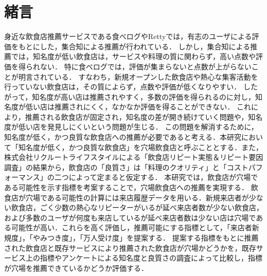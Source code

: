 \chapter{緒言}
\label{chap:intro}
身近な飲食店推薦サービスである食べログ\footnotemark{}やRetty\footnotemark{}では，有志のユーザによる評価をもとにした，集合知による推薦が行われている．
しかし，集合知による推薦では，知名度が低い飲食店は，サービスや料理の質に関わらず，高い点数や評価を得られない．
特に食べログでは，評価が集まらないと点数が上がらないことが明言されている\cite{score}．
すなわち，新規オープンした飲食店や熱心な集客活動を行っていない飲食店は，その質によらず，点数や評価が低くなりやすい．
したがって，知名度が高い店は推薦されやすく，多数の評価を得られるのに対し，知名度が低い店は推薦されにくく，なかなか評価を得ることができない．
これにより，推薦される飲食店が固定され，知名度の差が開き続けていく問題や，知名度が低い店を発見しにくいという問題が生じる．
この問題を解消するために，知名度が低く，かつ良質な飲食店への推薦が必要であると考える．本研究において「知名度が低く，かつ良質な飲食店」を穴場飲食店と呼ぶこととする．また，株式会社リクルートライフスタイルによる「飲食店リピート実態＆リピート要因調査」\cite{repeat}の結果から，飲食店の「良質さ」は「料理のクオリティ」と「コストパフォーマンス」の二つによって定まると仮定する．
本研究では，飲食店が穴場である可能性を示す指標を考案することで，穴場飲食店への推薦を実現する．
飲食店が穴場である可能性の計算には来店履歴データを用いる．新規来店者が少ない飲食店，ごく少数の熱心なリピーターがいるが延べ来店者数が少ない飲食店，および多数のユーザが何度も来店しているが延べ来店者数は少ない店は穴場である可能性が高い．これらを高く評価し，推薦可能にする指標として，「来店者新規度」，「やみつき度」，「万人受け度」を提案する．
提案する指標をもとに推薦された飲食店と既存サービスにより推薦された飲食店が穴場かどうかを，既存サービス上の指標やアンケートによる知名度と良質さの調査によって比較し，指標が穴場を推薦できているかどうか評価する．
